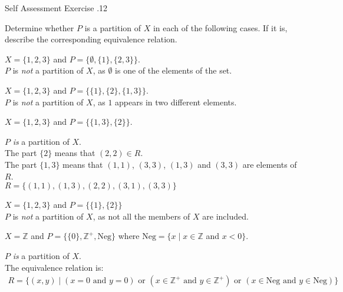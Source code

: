 \documentclass[\main/notes.tex]{subfiles}
\begin{document}
					\begin{exercise}{Self Assessment Exercise \thechapter.12}
						\begin{questions}
							\item{Determine whether $P$ is a partition of $X$ in each of the following cases. If it is, describe the corresponding equivalence relation.}
							\begin{questions}
								\item $X = \{1, 2, 3\}$ and $P = \bigl\{\emptyset, \{1\}, \{2, 3\}\bigr\}$.\\
									{\answer $P$ is \emph{not} a partition of $X$, as $\emptyset$ is one of the elements of the set.}
								\item $X = \{1, 2, 3\}$ and $P = \bigl\{\{1\}, \{2\}, \{1, 3\}\bigr\}$.\\
									{\answer $P$ is \emph{not} a partition of $X$, as $1$ appears in two different elements.}
								\item $X = \{1, 2, 3\}$ and $P = \bigl\{\{1, 3\}, \{2\}\bigr\}$.\\
									\begin{answer}
										$P$ \emph{is} a partition of $X$.\\
										The part $\{2\}$ means that $(2, 2) \in R$.\\
										The part $\{1, 3\}$ means that $(1, 1)$, $(3, 3)$, $(1, 3)$ and $(3, 3)$ are elements of $R$.\\
										$R = \bigl\{(1, 1), (1, 3), (2, 2), (3, 1), (3, 3)\bigr\}$
									\end{answer}
								\item $X = \{1, 2, 3\}$ and $P = \bigl\{\{1\}, \{2\}\bigr\}$\\
									{\answer $P$ is \emph{not} a partition of $X$, as not all the members of $X$ are included.}
								\item $X = \mathbb{Z}$ and $P = \bigl\{\{0\}, \mathbb{Z}^{+}, \mathrm{Neg}\bigr\}$ where $\mathrm{Neg} = \{x \mid x \in \mathbb{Z}$ and $ x < 0\}$.\\
									\begin{answer}
										$P$ \emph{is} a partition of $X$.\\
										The equivalence relation is:
										\begin{align*}
											R = \bigl\{(x, y) \mid (x = 0 \text{ and } y = 0) \text{ or } (x \in \mathbb{Z}^{+} \text{ and } y \in \mathbb{Z}^{+}) \text{ or } (x \in \mathrm{Neg} \text{ and } y \in \mathrm{Neg})\bigr\}
										\end{align*}

\end{answer}
\end{questions}
\end{questions}
\end{exercise}
\end{document}
